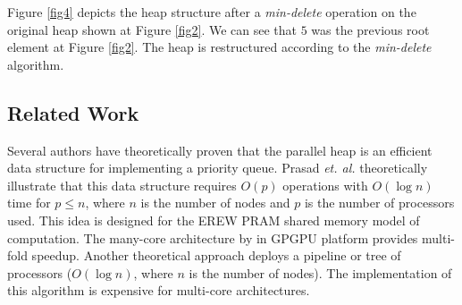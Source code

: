 \documentclass[10pt, conference, compsocconf]{IEEEtran}
\begin{document}
Figure \ref{fig4} depicts the heap structure after a {\it min-delete} operation on the original heap shown at Figure \ref{fig2}. 
We can see that $5$ was the previous root element at Figure \ref{fig2}. 
The heap is restructured according to the {\it min-delete} algorithm.


\subsection{Related Work}
Several authors have theoretically proven that the parallel heap is an efficient data structure for implementing a priority queue.
Prasad {\it et. al.} \cite{pq0,pq3} theoretically illustrate that this data structure requires $O(p)$ operations with $O(\log n)$ time for $p \leq n$, where $n$ is the number of nodes and $p$ is the number of processors used.
This idea is designed for the EREW PRAM shared memory model of computation.
The many-core architecture by \cite{pq2} in GPGPU platform provides multi-fold speedup.
Another theoretical approach \cite{pq4} deploys a pipeline or tree of processors ($O(\log n)$, where $n$ is the number of nodes).
The implementation of this algorithm \cite{pq5} is expensive for multi-core architectures.
\end{document}
